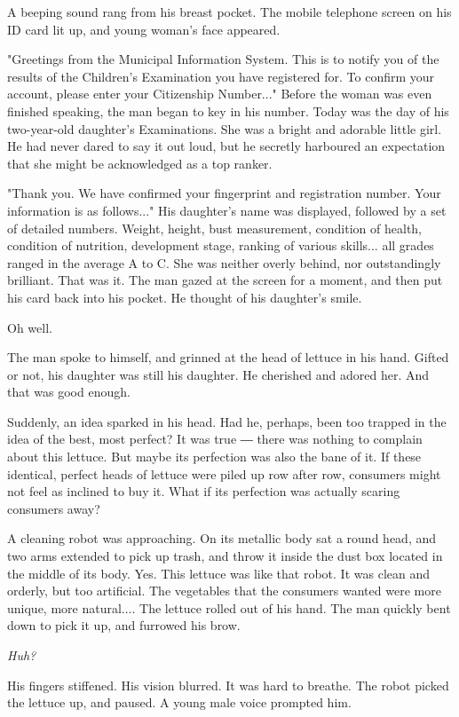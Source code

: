 A beeping sound rang from his breast pocket. The mobile telephone screen
on his ID card lit up, and young woman's face appeared.

"Greetings from the Municipal Information System. This is to notify you
of the results of the Children's Examination you have registered for. To
confirm your account, please enter your Citizenship Number..." Before
the woman was even finished speaking, the man began to key in his
number. Today was the day of his two-year-old daughter's Examinations.
She was a bright and adorable little girl. He had never dared to say it
out loud, but he secretly harboured an expectation that she might be
acknowledged as a top ranker.

"Thank you. We have confirmed your fingerprint and registration number.
Your information is as follows..." His daughter's name was displayed,
followed by a set of detailed numbers. Weight, height, bust measurement,
condition of health, condition of nutrition, development stage, ranking
of various skills... all grades ranged in the average A to C. She was
neither overly behind, nor outstandingly brilliant. That was it. The man
gazed at the screen for a moment, and then put his card back into his
pocket. He thought of his daughter's smile.

Oh well.

The man spoke to himself, and grinned at the head of lettuce in his
hand. Gifted or not, his daughter was still his daughter. He cherished
and adored her. And that was good enough.

Suddenly, an idea sparked in his head. Had he, perhaps, been too trapped
in the idea of the best, most perfect? It was true ― there was nothing
to complain about this lettuce. But maybe its perfection was also the
bane of it. If these identical, perfect heads of lettuce were piled up
row after row, consumers might not feel as inclined to buy it. What if
its perfection was actually scaring consumers away?

A cleaning robot was approaching. On its metallic body sat a round head,
and two arms extended to pick up trash, and throw it inside the dust box
located in the middle of its body. Yes. This lettuce was like that
robot. It was clean and orderly, but too artificial. The vegetables that
the consumers wanted were more unique, more natural.... The lettuce
rolled out of his hand. The man quickly bent down to pick it up, and
furrowed his brow.

\emph{Huh?}

His fingers stiffened. His vision blurred. It was hard to breathe. The
robot picked the lettuce up, and paused. A young male voice prompted
him.

